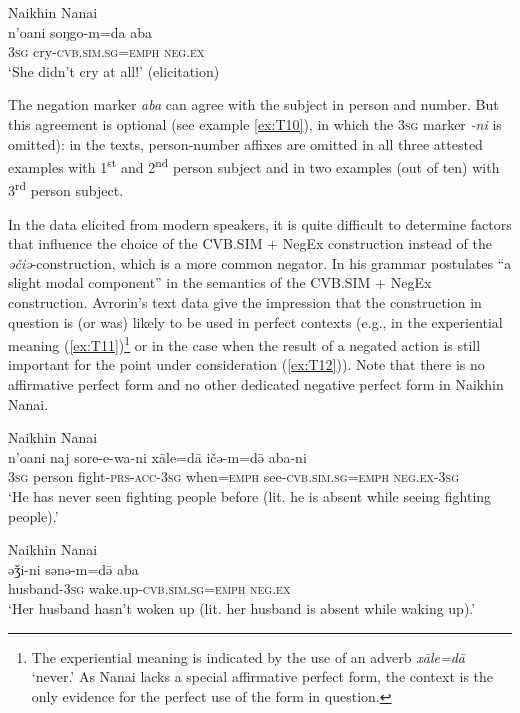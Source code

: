\documentclass[output=paper]{langscibook}
\begin{document}
\ea Naikhin Nanai \label{ex:T10}\\
	\gll n’oani	soŋgo-m=da	aba\\
	\textsc{3sg}	cry-\textsc{cvb.sim.sg=emph}	\textsc{neg.ex}\\
	\glt `She didn’t cry at all!' (elicitation)
\z

The negation marker \textit{aba} can agree with the subject in person and number. But this agreement is optional (see example \ref{ex:T10}), in which the \textsc{3sg} marker \textit{-ni} is omitted): in the texts, person-number affixes are omitted in all three attested examples with 1\textsuperscript{st} and 2\textsuperscript{nd} person subject and in two examples (out of ten) with 3\textsuperscript{rd} person subject.

In the data elicited from modern speakers, it is quite difficult to determine factors that influence the choice of the CVB.SIM + NegEx construction instead of the \textit{əčiə}-construction, which is a more common negator. In his grammar \citet[108]{avrorin1961a} postulates “a slight modal component” in the semantics of the CVB.SIM + NegEx construction. Avrorin’s text data give the impression that the construction in question is (or was) likely to be used in perfect contexts (e.g., in the experiential meaning (\ref{ex:T11})\footnote{The experiential meaning is indicated by the use of an adverb \textit{xāle=dā} ‘never.’ As Nanai lacks a special affirmative perfect form, the context is the only evidence for the perfect use of the form in question.} or in the case when the result of a negated action is still important for the point under consideration (\ref{ex:T12})). Note that there is no affirmative perfect form and no other dedicated negative perfect form in Naikhin Nanai.

\ea Naikhin Nanai \label{ex:T11}\\
	\gll n’oani	naj	sore-e-wa-ni	xāle=dā	ičə-m=də̄	aba-ni\\
	\textsc{3sg}	person	fight-\textsc{prs-acc-3sg}	when=\textsc{emph}	see-\textsc{cvb.sim.sg=emph}	\textsc{neg.ex-3sg}\\
	\glt `He has never seen fighting people before (lit. he is absent while seeing fighting people).' \citep[154, text]{avrorin1986a}
\z

\ea Naikhin Nanai \label{ex:T12}\\
	\gll əǯi-ni	sənə-m=də̄	aba\\
	husband-\textsc{3sg}	wake.up-\textsc{cvb.sim.sg=emph}	\textsc{neg.ex}\\
	\glt `Her husband hasn’t woken up (lit. her husband is absent while waking up).' \citep[209, text]{avrorin1986a}
\z
\end{document}

